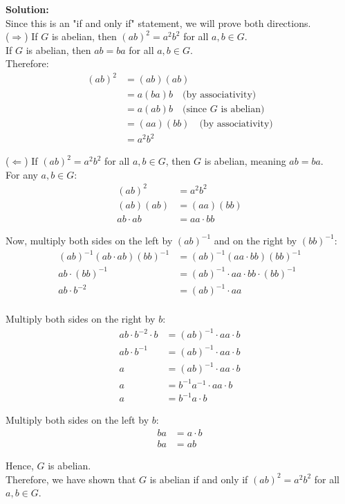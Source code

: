 \documentclass{article}
\begin{document}
\textbf{Solution:} \\

Since this is an "if and only if" statement, we will prove both directions. \\

($\Rightarrow$) If $G$ is abelian, then $(ab)^2 = a^2b^2$ for all $a,b \in G$. \\

If $G$ is abelian, then $ab = ba$ for all $a,b \in G$. \\

Therefore:
\begin{align*}
(ab)^2 &= (ab)(ab) \\
&= a(ba)b \quad \text{(by associativity)} \\
&= a(ab)b \quad \text{(since $G$ is abelian)} \\
&= (aa)(bb) \quad \text{(by associativity)} \\
&= a^2b^2
\end{align*}

($\Leftarrow$) If $(ab)^2 = a^2b^2$ for all $a,b \in G$, then $G$ is abelian, meaning $ab = ba$. \\

For any $a,b \in G$:
\begin{align*}
(ab)^2 &= a^2b^2 \\
(ab)(ab) &= (aa)(bb) \\
ab \cdot ab &= aa \cdot bb
\end{align*}

Now, multiply both sides on the left by $(ab)^{-1}$ and on the right by $(bb)^{-1}$:
\begin{align*}
(ab)^{-1}(ab \cdot ab)(bb)^{-1} &= (ab)^{-1}(aa \cdot bb)(bb)^{-1} \\
ab \cdot (bb)^{-1} &= (ab)^{-1} \cdot aa \cdot bb \cdot (bb)^{-1} \\
ab \cdot b^{-2} &= (ab)^{-1} \cdot aa \\
\end{align*}

Multiply both sides on the right by $b$:
\begin{align*}
ab \cdot b^{-2} \cdot b &= (ab)^{-1} \cdot aa \cdot b \\
ab \cdot b^{-1} &= (ab)^{-1} \cdot aa \cdot b \\
a &= (ab)^{-1} \cdot aa \cdot b \\
a &= b^{-1}a^{-1} \cdot aa \cdot b \\
a &= b^{-1}a \cdot b
\end{align*}

Multiply both sides on the left by $b$:
\begin{align*}
ba &= a \cdot b \\
ba &= ab
\end{align*}

Hence, $G$ is abelian. \\

Therefore, we have shown that $G$ is abelian if and only if $(ab)^2 = a^2b^2$ for all $a,b \in G$.
\end{document}
